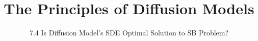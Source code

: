 ﻿%

\graphicspath{{../images/}}
\title{The Principles of Diffusion Models}
\subtitle{7.4 Is Diffusion Model's SDE Optimal Solution to SB Problem?}


\begin{frame}
    \titlepage
\end{frame}



